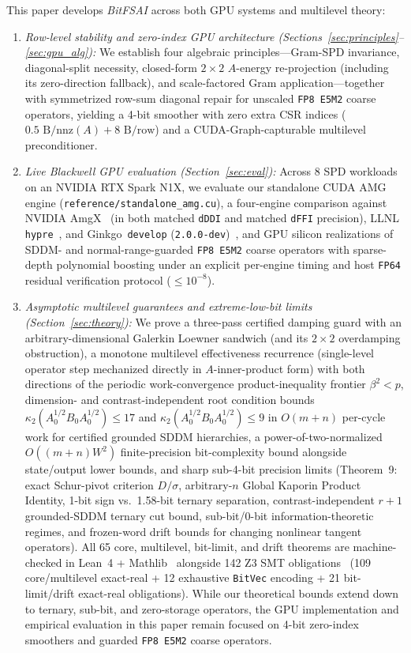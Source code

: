 \documentclass[10pt]{article}
\begin{document}
This paper develops \emph{BitFSAI} across both GPU systems and multilevel theory:
\begin{enumerate}
  \item \emph{Row-level stability and zero-index GPU architecture (Sections~\ref{sec:principles}--\ref{sec:gpu_alg}):} We establish four algebraic principles---Gram-SPD invariance, diagonal-split necessity, closed-form $2\times 2$ $A$-energy re-projection (including its zero-direction fallback), and scale-factored Gram application---together with symmetrized row-sum diagonal repair for unscaled \texttt{FP8 E5M2} coarse operators, yielding a 4-bit smoother with zero extra CSR indices ($0.5\text{ B/nnz}(A) + 8\text{ B/row}$) and a CUDA-Graph-capturable multilevel preconditioner.
  \item \emph{Live Blackwell GPU evaluation (Section~\ref{sec:eval}):} Across 8 SPD workloads on an NVIDIA RTX Spark N1X, we evaluate our standalone CUDA AMG engine (\texttt{reference/standalone\_amg.cu}), a four-engine comparison against NVIDIA AmgX~\cite{naumov2015amgx} (in both matched \texttt{dDDI} and matched \texttt{dFFI} precision), LLNL \texttt{hypre}~\cite{falgout2002hypre}, and Ginkgo~\texttt{develop} (\texttt{2.0.0-dev})~\cite{anzt2022ginkgo}, and GPU silicon realizations of SDDM- and normal-range-guarded \texttt{FP8 E5M2} coarse operators with sparse-depth polynomial boosting under an explicit per-engine timing and host \texttt{FP64} residual verification protocol ($\le 10^{-8}$).
  \item \emph{Asymptotic multilevel guarantees and extreme-low-bit limits (Section~\ref{sec:theory}):} We prove a three-pass certified damping guard with an arbitrary-dimensional Galerkin Loewner sandwich (and its $2\times 2$ overdamping obstruction), a monotone multilevel effectiveness recurrence (single-level operator step mechanized directly in $A$-inner-product form) with both directions of the periodic work-convergence product-inequality frontier $\beta^2 < p$, dimension- and contrast-independent root condition bounds $\kappa_2(A_0^{1/2} B_0 A_0^{1/2}) \le 17$ and $\kappa_2(A_0^{1/2} B_0 A_0^{1/2}) \le 9$ in $O(m+n)$ per-cycle work for certified grounded SDDM hierarchies, a power-of-two-normalized $O((m+n)W^2)$ finite-precision bit-complexity bound alongside state/output lower bounds, and sharp sub-4-bit precision limits (Theorem~9: exact Schur-pivot criterion $D/\sigma$, arbitrary-$n$ Global Kaporin Product Identity, 1-bit sign vs.\ 1.58-bit ternary separation, contrast-independent $r+1$ grounded-SDDM ternary cut bound, sub-bit/0-bit information-theoretic regimes, and frozen-word drift bounds for changing nonlinear tangent operators). All 65 core, multilevel, bit-limit, and drift theorems are machine-checked in Lean~4 + Mathlib~\cite{demoura2021lean4,mathlib2020} alongside 142 Z3 SMT obligations~\cite{demoura2008z3} (109 core/multilevel exact-real + 12 exhaustive \texttt{BitVec} encoding + 21 bit-limit/drift exact-real obligations). While our theoretical bounds extend down to ternary, sub-bit, and zero-storage operators, the GPU implementation and empirical evaluation in this paper remain focused on 4-bit zero-index smoothers and guarded \texttt{FP8 E5M2} coarse operators.
\end{enumerate}
\end{document}

